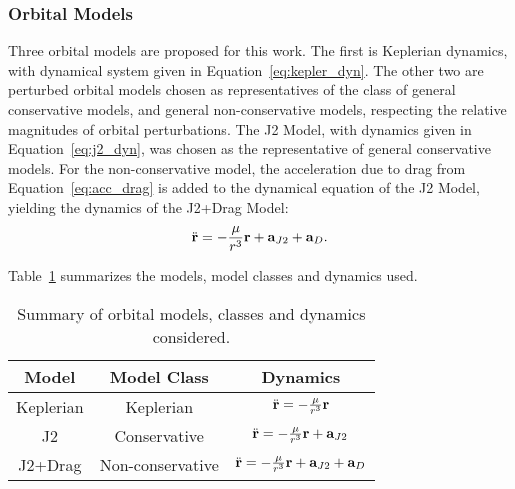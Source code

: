 
\subsubsection{Orbital Models}

Three orbital models are proposed for this work. The first is Keplerian dynamics, with dynamical system given in Equation~\eqref{eq:kepler_dyn}. The other two are perturbed orbital models chosen as representatives of the class of general conservative models, and general non-conservative models, respecting the relative magnitudes of orbital perturbations. The J2 Model, with dynamics given in Equation~\eqref{eq:j2_dyn}, was chosen as the representative of general conservative models. For the non-conservative model, the acceleration due to drag from Equation~\eqref{eq:acc_drag} is added to the dynamical equation of the J2 Model, yielding the dynamics of the J2+Drag Model:
\begin{equation}
    \ddot{\mathbf{r}} = -\frac{\mu}{r^3} \mathbf{r} + \mathbf{a}_{J2} + \mathbf{a}_{D}.
\end{equation}

Table~\ref{tab:orb_models} summarizes the models, model classes and dynamics used.

\begin{table}[htbp]
    \centering
    \begin{tabular}{ccc}\toprule
        Model & Model Class & Dynamics \\ \midrule
        Keplerian & Keplerian & \(\ddot{\mathbf{r}} = -\frac{\mu}{r^3} \mathbf{r}\) \\
        J2 & Conservative & \(\ddot{\mathbf{r}} = -\frac{\mu}{r^3} \mathbf{r} + \mathbf{a}_{J2}\) \\
        J2+Drag & Non-conservative & \(\ddot{\mathbf{r}} = -\frac{\mu}{r^3} \mathbf{r} + \mathbf{a}_{J2} + \mathbf{a}_{D}\) \\ \bottomrule
    \end{tabular}
    \caption{Summary of orbital models, classes and dynamics considered.}
    \label{tab:orb_models}
\end{table}

